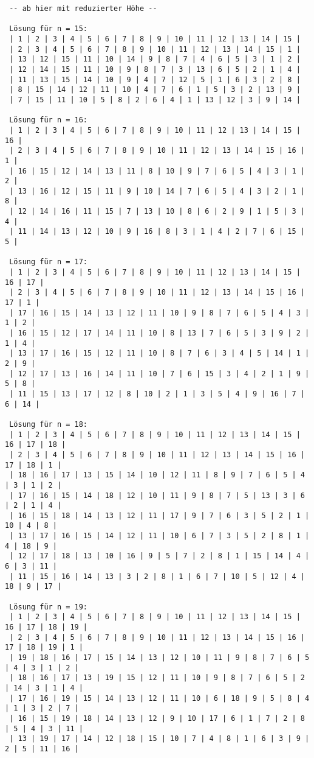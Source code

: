 \documentclass[a4paper, notitlepage, 12pt]{scrartcl}
\begin{document}
\begin{center}
\begin{Verbatim}
 -- ab hier mit reduzierter Höhe --
 
 Lösung für n = 15: 
 | 1 | 2 | 3 | 4 | 5 | 6 | 7 | 8 | 9 | 10 | 11 | 12 | 13 | 14 | 15 | 
 | 2 | 3 | 4 | 5 | 6 | 7 | 8 | 9 | 10 | 11 | 12 | 13 | 14 | 15 | 1 | 
 | 13 | 12 | 15 | 11 | 10 | 14 | 9 | 8 | 7 | 4 | 6 | 5 | 3 | 1 | 2 | 
 | 12 | 14 | 15 | 11 | 10 | 9 | 8 | 7 | 3 | 13 | 6 | 5 | 2 | 1 | 4 | 
 | 11 | 13 | 15 | 14 | 10 | 9 | 4 | 7 | 12 | 5 | 1 | 6 | 3 | 2 | 8 | 
 | 8 | 15 | 14 | 12 | 11 | 10 | 4 | 7 | 6 | 1 | 5 | 3 | 2 | 13 | 9 | 
 | 7 | 15 | 11 | 10 | 5 | 8 | 2 | 6 | 4 | 1 | 13 | 12 | 3 | 9 | 14 | 
 
 Lösung für n = 16: 
 | 1 | 2 | 3 | 4 | 5 | 6 | 7 | 8 | 9 | 10 | 11 | 12 | 13 | 14 | 15 | 16 | 
 | 2 | 3 | 4 | 5 | 6 | 7 | 8 | 9 | 10 | 11 | 12 | 13 | 14 | 15 | 16 | 1 | 
 | 16 | 15 | 12 | 14 | 13 | 11 | 8 | 10 | 9 | 7 | 6 | 5 | 4 | 3 | 1 | 2 | 
 | 13 | 16 | 12 | 15 | 11 | 9 | 10 | 14 | 7 | 6 | 5 | 4 | 3 | 2 | 1 | 8 | 
 | 12 | 14 | 16 | 11 | 15 | 7 | 13 | 10 | 8 | 6 | 2 | 9 | 1 | 5 | 3 | 4 | 
 | 11 | 14 | 13 | 12 | 10 | 9 | 16 | 8 | 3 | 1 | 4 | 2 | 7 | 6 | 15 | 5 | 
 
 Lösung für n = 17: 
 | 1 | 2 | 3 | 4 | 5 | 6 | 7 | 8 | 9 | 10 | 11 | 12 | 13 | 14 | 15 | 16 | 17 | 
 | 2 | 3 | 4 | 5 | 6 | 7 | 8 | 9 | 10 | 11 | 12 | 13 | 14 | 15 | 16 | 17 | 1 | 
 | 17 | 16 | 15 | 14 | 13 | 12 | 11 | 10 | 9 | 8 | 7 | 6 | 5 | 4 | 3 | 1 | 2 | 
 | 16 | 15 | 12 | 17 | 14 | 11 | 10 | 8 | 13 | 7 | 6 | 5 | 3 | 9 | 2 | 1 | 4 | 
 | 13 | 17 | 16 | 15 | 12 | 11 | 10 | 8 | 7 | 6 | 3 | 4 | 5 | 14 | 1 | 2 | 9 | 
 | 12 | 17 | 13 | 16 | 14 | 11 | 10 | 7 | 6 | 15 | 3 | 4 | 2 | 1 | 9 | 5 | 8 | 
 | 11 | 15 | 13 | 17 | 12 | 8 | 10 | 2 | 1 | 3 | 5 | 4 | 9 | 16 | 7 | 6 | 14 | 
 
 Lösung für n = 18:
 | 1 | 2 | 3 | 4 | 5 | 6 | 7 | 8 | 9 | 10 | 11 | 12 | 13 | 14 | 15 | 16 | 17 | 18 | 
 | 2 | 3 | 4 | 5 | 6 | 7 | 8 | 9 | 10 | 11 | 12 | 13 | 14 | 15 | 16 | 17 | 18 | 1 | 
 | 18 | 16 | 17 | 13 | 15 | 14 | 10 | 12 | 11 | 8 | 9 | 7 | 6 | 5 | 4 | 3 | 1 | 2 | 
 | 17 | 16 | 15 | 14 | 18 | 12 | 10 | 11 | 9 | 8 | 7 | 5 | 13 | 3 | 6 | 2 | 1 | 4 | 
 | 16 | 15 | 18 | 14 | 13 | 12 | 11 | 17 | 9 | 7 | 6 | 3 | 5 | 2 | 1 | 10 | 4 | 8 | 
 | 13 | 17 | 16 | 15 | 14 | 12 | 11 | 10 | 6 | 7 | 3 | 5 | 2 | 8 | 1 | 4 | 18 | 9 | 
 | 12 | 17 | 18 | 13 | 10 | 16 | 9 | 5 | 7 | 2 | 8 | 1 | 15 | 14 | 4 | 6 | 3 | 11 | 
 | 11 | 15 | 16 | 14 | 13 | 3 | 2 | 8 | 1 | 6 | 7 | 10 | 5 | 12 | 4 | 18 | 9 | 17 | 
 
 Lösung für n = 19: 
 | 1 | 2 | 3 | 4 | 5 | 6 | 7 | 8 | 9 | 10 | 11 | 12 | 13 | 14 | 15 | 16 | 17 | 18 | 19 | 
 | 2 | 3 | 4 | 5 | 6 | 7 | 8 | 9 | 10 | 11 | 12 | 13 | 14 | 15 | 16 | 17 | 18 | 19 | 1 | 
 | 19 | 18 | 16 | 17 | 15 | 14 | 13 | 12 | 10 | 11 | 9 | 8 | 7 | 6 | 5 | 4 | 3 | 1 | 2 | 
 | 18 | 16 | 17 | 13 | 19 | 15 | 12 | 11 | 10 | 9 | 8 | 7 | 6 | 5 | 2 | 14 | 3 | 1 | 4 | 
 | 17 | 16 | 19 | 15 | 14 | 13 | 12 | 11 | 10 | 6 | 18 | 9 | 5 | 8 | 4 | 1 | 3 | 2 | 7 | 
 | 16 | 15 | 19 | 18 | 14 | 13 | 12 | 9 | 10 | 17 | 6 | 1 | 7 | 2 | 8 | 5 | 4 | 3 | 11 | 
 | 13 | 19 | 17 | 14 | 12 | 18 | 15 | 10 | 7 | 4 | 8 | 1 | 6 | 3 | 9 | 2 | 5 | 11 | 16 | 
 

\end{Verbatim}
\end{center}
\end{document}
